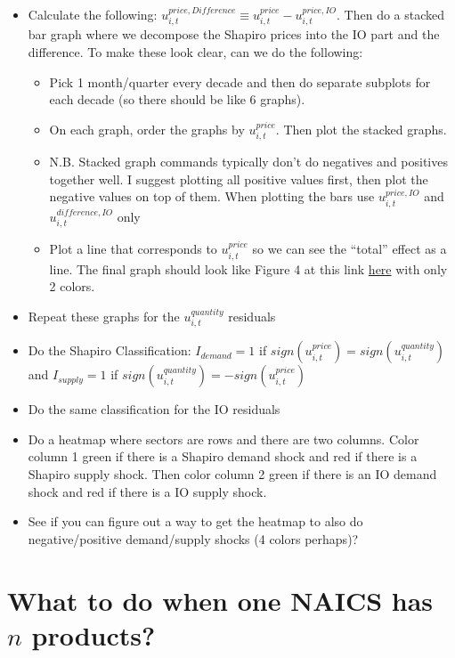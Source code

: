 \documentclass[12pt,english]{article}
\begin{document}
\begin{itemize}
	\item Calculate the following: $u^{price,Difference}_{i,t} \equiv u_{i,t}^{price}-u_{i,t}^{price,IO}$. Then do a stacked bar graph where we decompose the Shapiro prices into the IO part and the difference. To make these look clear, can we do the following:
	\begin{itemize}
		\item Pick 1 month/quarter every decade and then do separate subplots for each decade (so there should be like 6 graphs). 
		\item On each graph, order the graphs by $u_{i,t}^{price}$. Then plot the stacked graphs.
		\item N.B. Stacked graph commands typically don't do negatives and positives together well. I suggest plotting all positive values first, then plot the negative values on top of them. When plotting the bars use $u_{i,t}^{price,IO}$ and $u_{i,t}^{difference,IO}$ only 
		\item Plot a line that corresponds to $u_{i,t}^{price}$ so we can see the ``total'' effect as a line. The final graph should look like Figure 4 at this link \href{https://www.rbnz.govt.nz/-/media/project/sites/rbnz/files/publications/analytical-notes/2013/an2013-09.pdf#page=13}{here} with only 2 colors.	
	\end{itemize}
	\item Repeat these graphs for the $u_{i,t}^{quantity}$ residuals 
	\item Do the Shapiro Classification: $I_{demand}=1$ if $sign(u_{i,t}^{price})=sign(u_{i,t}^{quantity})$ and $I_{supply}=1$ if $sign(u_{i,t}^{quantity})=-sign(u_{i,t}^{price})$
	\item Do the same classification for the IO residuals
	\item Do a heatmap where sectors are rows and there are two columns. Color column 1 green if there is a Shapiro demand shock and red if there is a Shapiro supply shock. Then color column 2 green if there is an IO demand shock and red if there is a IO supply shock.
	\item See if you can figure out a way to get the heatmap to also do negative/positive demand/supply shocks (4 colors perhaps)?
\end{itemize}

\section*{What to do when one NAICS has $n$ products?}
\end{document}
